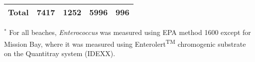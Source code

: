 \documentclass[12pt]{article}\usepackage[]{graphicx}\usepackage[]{color}
\begin{document}
\begin{table}[h!tb]
\begin{center}
\begin{tabular}{l rr rr}
\hline
 Total & 7417 & 1252 & 5996 & 996 \\ 
  
\hline
\end{tabular}

\medskip

\begin{minipage}{0.7\textwidth}
\begin{scriptsize}
$^*$ For all beaches, \textit{Enterococcus} was measured using EPA method 1600 except for Mission Bay, where it was measured using Enterolert\textsuperscript{\scriptsize{TM}} chromogenic substrate on the Quantitray system (IDEXX). 
\end{scriptsize}
\end{minipage}
\end{center}
\end{table}
\end{document}
